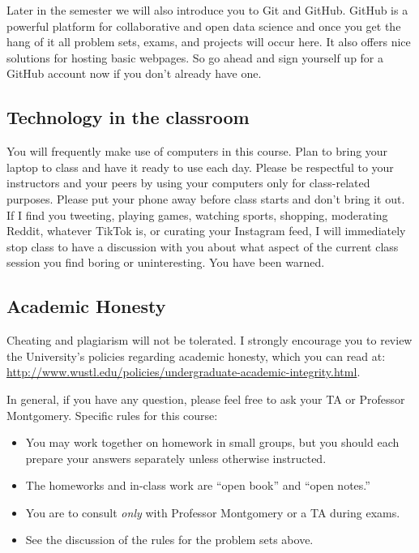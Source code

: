 \documentclass[11pt]{article}
\begin{document}
Later in the semester we will also introduce you to Git and GitHub.  GitHub is a powerful platform for collaborative and open data science and once you get the hang of it all problem sets, exams, and projects will occur here.  It also offers nice solutions for hosting basic webpages.  So go ahead and sign yourself up for a GitHub account now if you don't already have one.



\subsection*{Technology in the classroom}

You will frequently make use of computers in this course. Plan to
bring your laptop to class and have it ready to use each day.  Please
be respectful to your instructors and your peers by using your
computers only for class-related purposes.  Please put your phone away
before class starts and don't bring it out.  If I find you tweeting,
playing games, watching sports, shopping, moderating Reddit, whatever
TikTok is, or curating your Instagram feed, I will immediately stop
class to have a discussion with you about what aspect of the current
class session you find boring or uninteresting.  You have been warned. 

\subsection*{Academic Honesty} 

Cheating and plagiarism will not be tolerated.  I strongly encourage
you to review the University's policies regarding academic honesty,
which you can read at:
\url{http://www.wustl.edu/policies/undergraduate-academic-integrity.html}.

In general, if you have any question, please feel free to ask
your TA or Professor Montgomery. Specific rules for this course:
\begin{itemize}
\item You may work together on homework in small groups, but you
  should each prepare your answers separately unless otherwise instructed.
\item The homeworks and in-class work are ``open book'' and ``open
  notes.''  
\item You are to consult \textit{only} with Professor Montgomery or
  a TA during exams.
\item See the discussion of the rules for the problem sets above.
\end{itemize}
\end{document}
